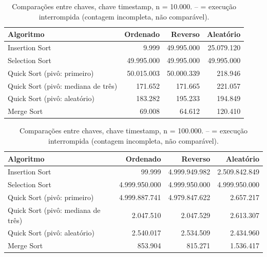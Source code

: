 \begin{table}[ht]
\centering
\caption{Compara\c{c}\~oes entre chaves, chave timestamp, n = 10.000. -- = execu\c{c}\~ao interrompida (contagem incompleta, n\~ao compar\'avel).}
\label{tab:comp-timestamp-10000}
\begin{tabular}{lrrr}
\hline
Algoritmo & Ordenado & Reverso & Aleat\'orio \\
\hline
Insertion Sort & 9.999 & 49.995.000 & 25.079.120 \\
Selection Sort & 49.995.000 & 49.995.000 & 49.995.000 \\
Quick Sort (piv\^o: primeiro) & 50.015.003 & 50.000.339 & 218.946 \\
Quick Sort (piv\^o: mediana de tr\^es) & 171.652 & 171.665 & 221.057 \\
Quick Sort (piv\^o: aleat\'orio) & 183.282 & 195.233 & 194.849 \\
Merge Sort & 69.008 & 64.612 & 120.410 \\
\hline
\end{tabular}
\end{table}

\begin{table}[ht]
\centering
\caption{Compara\c{c}\~oes entre chaves, chave timestamp, n = 100.000. -- = execu\c{c}\~ao interrompida (contagem incompleta, n\~ao compar\'avel).}
\label{tab:comp-timestamp-100000}
\begin{tabular}{lrrr}
\hline
Algoritmo & Ordenado & Reverso & Aleat\'orio \\
\hline
Insertion Sort & 99.999 & 4.999.949.982 & 2.509.842.849 \\
Selection Sort & 4.999.950.000 & 4.999.950.000 & 4.999.950.000 \\
Quick Sort (piv\^o: primeiro) & 4.999.887.741 & 4.979.847.622 & 2.657.217 \\
Quick Sort (piv\^o: mediana de tr\^es) & 2.047.510 & 2.047.529 & 2.613.307 \\
Quick Sort (piv\^o: aleat\'orio) & 2.540.017 & 2.534.509 & 2.434.960 \\
Merge Sort & 853.904 & 815.271 & 1.536.417 \\
\hline
\end{tabular}
\end{table}

